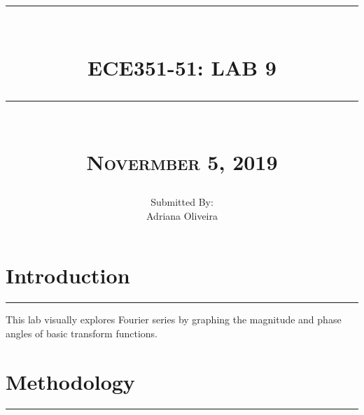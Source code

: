 \documentclass[12pt]{report}
\newcommand{\HRule}[1]{\rule{\linewidth}{#1}}
\begin{document}
\title{ 
		\\ [2.0cm]
		\HRule{0.5pt} \\
		\LARGE \textbf{\uppercase{ECE351-51: Lab 9}} 
		\HRule{2pt} \\ [0.5cm]
		\normalsize\textsc{Novermber 5, 2019} \vspace*{5\baselineskip}}

\date{}
\author{\normalsize
		Submitted By: \\
		\normalsize Adriana Oliveira\\}

\maketitle

\newpage

\sectionfont{\scshape}
\section*{Introduction}
\hrule
\vspace{1cm}
\setlength{\parindent}{5ex}
This lab visually explores Fourier series by graphing the magnitude and phase angles of basic transform functions. 

\section*{Methodology}
\hrule
\vspace{1cm}
\setlength{\parindent}{5ex}


\vspace{-0.5cm}
\end{document}
